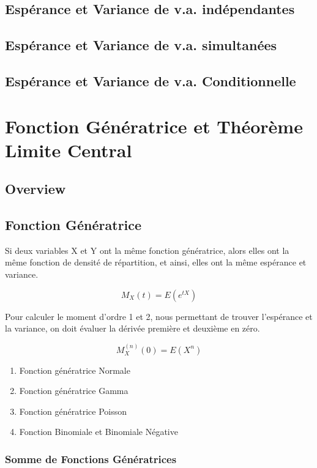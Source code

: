 \documentclass{article}
\begin{document}
\subsection{Espérance et Variance de v.a. indépendantes}
\subsection{Espérance et Variance de v.a. simultanées}
\subsection{Espérance et Variance de v.a. Conditionnelle}

\section{Fonction Génératrice et Théorème Limite Central}

\subsection*{Overview}


\subsection{Fonction Génératrice}

Si deux variables X et Y ont la même fonction génératrice, alors elles
ont la même fonction de densité de répartition, et ainsi, elles ont
la même espérance et variance.

$$ M_X(t) = E(e^{tX})$$

Pour calculer le moment d'ordre 1 et 2, nous permettant de trouver
l'espérance et la variance, on doit évaluer la dérivée première et deuxième
en zéro.

$$ M_X ^(n) (0) = E(X^n) $$

\begin{enumerate}
    \item Fonction génératrice Normale
    \item Fonction génératrice Gamma
    \item Fonction génératrice Poisson
    \item Fonction Binomiale et Binomiale Négative
\end{enumerate}

\subsubsection{ Somme de Fonctions Génératrices}
\end{document}
